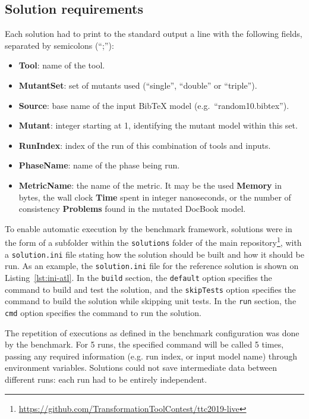 \documentclass[a4paper]{article}
\newcommand*{\file}[1]{\texttt{#1}}
\begin{document}
\subsection{Solution requirements}
\label{sec:solut-requ}

Each solution had to print to the standard output a line with the following
fields, separated by semicolons (``;''):

\begin{itemize}
\item \textbf{Tool}: name of the tool.
\item \textbf{MutantSet}: set of mutants used (``single'', ``double'' or ``triple'').
\item \textbf{Source}: base name of the input BibTeX model (e.g.\ ``random10.bibtex'').
\item \textbf{Mutant}: integer starting at 1, identifying the mutant model within this set.
\item \textbf{RunIndex}: index of the run of this combination of tools and inputs.
\item \textbf{PhaseName}: name of the phase being run.
\item \textbf{MetricName}: the name of the metric. It may be the used
  \textbf{Memory} in bytes, the wall clock \textbf{Time} spent in integer
  nanoseconds, or the number of consistency \textbf{Problems} found in the
  mutated DocBook model.
\end{itemize}



To enable automatic execution by the benchmark framework, solutions were in the
form of a subfolder within the \file{solutions} folder of the main
repository\footnote{\url{https://github.com/TransformationToolContest/ttc2019-live}},
with a \file{solution.ini} file stating how the solution should be built and how
it should be run. As an example, the \file{solution.ini} file for the reference
solution is shown on Listing~\ref{lst:ini-atl}. In the \file{build} section, the
\file{default} option specifies the command to build and test the solution, and
the \file{skipTests} option specifies the command to build the solution while
skipping unit tests. In the \file{run} section, the \file{cmd} option specifies
the command to run the solution.

The repetition of executions as defined in the benchmark configuration was done
by the benchmark. For 5 runs, the specified command will be called 5 times,
passing any required information (e.g. run index, or input model name) through
environment variables. Solutions could not save intermediate data between
different runs: each run had to be entirely independent.
\end{document}
